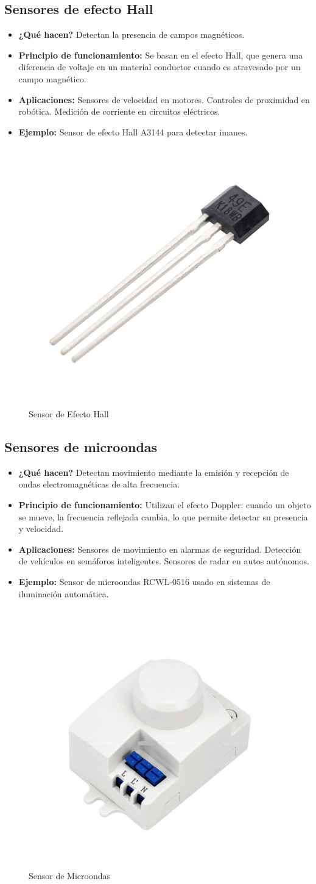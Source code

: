 \subsection*{Sensores de efecto Hall}
\begin{itemize}
	\item \textbf{¿Qué hacen?} Detectan la presencia de campos magnéticos.
	\item \textbf{Principio de funcionamiento:} Se basan en el efecto Hall, que genera una diferencia de voltaje en un material conductor cuando es atravesado por un campo magnético.
	\item \textbf{Aplicaciones:} Sensores de velocidad en motores.
	Controles de proximidad en robótica.
	Medición de corriente en circuitos eléctricos.
	\item \textbf{Ejemplo:} Sensor de efecto Hall A3144 para detectar imanes.
\end{itemize}
\begin{figure}[h]
	\centering
	\includegraphics[width=0.2\linewidth]{img/sensor de efecto hall}
	\caption{Sensor de Efecto Hall}
	\label{fig:sensor de efecto hall}
\end{figure}

\subsection*{Sensores de microondas}
\begin{itemize}
	\item \textbf{¿Qué hacen?} Detectan movimiento mediante la emisión y recepción de ondas electromagnéticas de alta frecuencia.
	\item \textbf{Principio de funcionamiento:} Utilizan el efecto Doppler: cuando un objeto se mueve, la frecuencia reflejada cambia, lo que permite detectar su presencia y velocidad.
	\item \textbf{Aplicaciones:} Sensores de movimiento en alarmas de seguridad.
	Detección de vehículos en semáforos inteligentes.
	Sensores de radar en autos autónomos.
	\item \textbf{Ejemplo:} Sensor de microondas RCWL-0516 usado en sistemas de iluminación automática.
\end{itemize}
\begin{figure}[h]
	\centering
	\includegraphics[width=0.3\linewidth]{img/sensor de microondas}
	\caption{Sensor de Microondas}
	\label{fig:sensor de microondas}
\end{figure}

